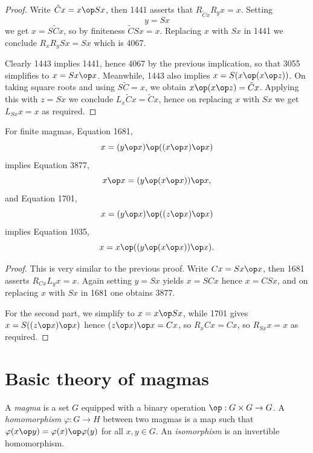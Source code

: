 \begin{proof}\leanok
  Write $\tilde C x = x \op Sx$, then 1441 asserts that $R_{\tilde Cx} R_y x = x$.  Setting $$y=Sx$$ we get $x = S\tilde Cx$, so by finiteness $\tilde C Sx = x$.  Replacing $x$ with $Sx$ in 1441 we conclude $R_x R_y Sx = Sx$ which is 4067.

  Clearly 1443 implies 1441, hence 4067 by the previous implication, so that 3055 simplifies to $x = Sx \op x$.  Meanwhile, 1443 also implies $x = S(x \op (x \op z))$.  On taking square roots and using $S \tilde C = x$, we obtain $x \op (x \op z) = \tilde Cx$.  Applying this with $z = Sx$ we conclude $L_x \tilde Cx = \tilde Cx$, hence on replacing $x$ with $Sx$ we get $L_{Sx} x = x$ as required.
\end{proof}

\begin{proposition}\label{1681-3877-1701-1035}\leanok{}
  For finite magmas, Equation 1681,
$$ x = (y \op x) \op ((x \op x) \op x)$$
implies Equation 3877,
$$ x \op x = (y \op (x \op x)) \op x,$$
and Equation 1701,
$$ x = (y \op x) \op ((z \op x) \op x)$$
implies Equation 1035,
$$ x = x \op ((y \op (x \op x)) \op x).$$
\end{proposition}

\begin{proof}\leanok This is very similar to the previous proof.
  Write $Cx = Sx \op x$, then 1681 asserts $R_{Cx} L_y x = x$.  Again setting $y=Sx$ yields $x=SCx$ hence $x = CSx$, and on replacing $x$ with $Sx$ in 1681 one obtains 3877.

For the second part, we simplify to $x = x \op Sx$, while 1701 gives $x = S((z \op x) \op x)$ hence $(z \op x) \op x = Cx$, so $R_x Cx = Cx$, so $R_{Sx} x = x$ as required.
\end{proof}


\chapter{Basic theory of magmas}\label{basic-theory-chapter}
\begin{definition}[Magma]\label{magma-def}\leanok
  A \emph{magma} is a set $G$ equipped with a binary operation $\op: G \times G \to G$.
  A \emph{homomorphism} $\varphi : G \to H$ between two magmas is a map such that $\varphi(x \op y) = \varphi(x) \op \varphi(y)$ for all $x,y \in G$.
  An \emph{isomorphism} is an invertible homomorphism.
\end{definition}

